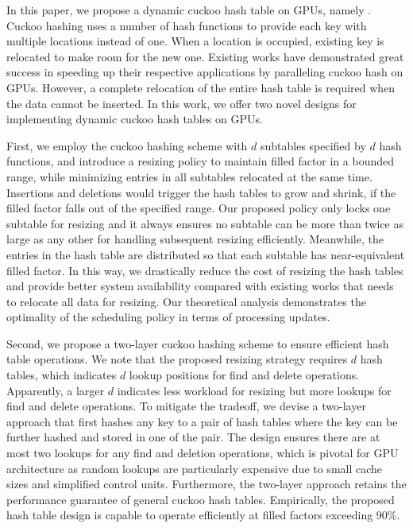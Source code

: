 In this paper, we propose a dynamic cuckoo hash table on GPUs, namely \voter. Cuckoo hashing \cite{pagh2004cuckoo} uses a number of hash functions to provide each key with multiple locations instead of one. When a location is occupied, existing key is relocated to make room for the new one. Existing works \cite{alcantara2009real,alcantara2011building,zhang2015mega,breslow2016horton} have demonstrated great success in speeding up their respective applications by paralleling cuckoo hash on GPUs. 
However, a complete relocation of the entire hash table is required when the data cannot be  inserted.
In this work, we offer two novel designs for implementing dynamic cuckoo hash tables on GPUs.

First, we employ the cuckoo hashing scheme with $d$ subtables specified by $d$ hash functions, and introduce a resizing policy to maintain filled factor in a bounded range, while minimizing entries in all subtables relocated at the same time. Insertions and deletions would trigger the hash tables to grow and shrink, if the filled factor falls out of the specified range. 
Our proposed policy only locks one subtable for resizing and it always ensures no subtable can be more than twice as large as any other for handling subsequent resizing efficiently. Meanwhile, the entries in the hash table are distributed so that each subtable has near-equivalent filled factor.
In this way, we drastically reduce the cost of resizing the hash tables and provide better system availability compared with existing works that needs to relocate all data for resizing.
Our theoretical analysis demonstrates the optimality of the scheduling policy in terms of processing updates. 

Second, we propose a two-layer cuckoo hashing scheme to ensure efficient hash table operations. 
We note that the proposed resizing strategy requires $d$ hash tables, which indicates $d$ lookup positions for find and delete operations. Apparently, a larger $d$ indicates less workload for resizing but more lookups for find and delete operations. To mitigate the tradeoff, we devise a two-layer approach that first hashes any key to a pair of hash tables where the key can be further hashed and stored in one of the pair. 
The design ensures there are at most two lookups for any find and deletion operations, which is pivotal for GPU architecture as random lookups are particularly expensive due to small cache sizes and simplified control units.
Furthermore, the two-layer approach retains the performance guarantee of general cuckoo hash tables.
Empirically, the proposed hash table design is capable to operate efficiently at filled factors exceeding 90\%.

